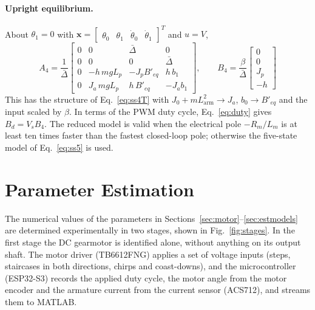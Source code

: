\documentclass[a4paper,11pt]{article}
\newcommand{\La}{L_{\mathrm{arm}}}
\begin{document}
\paragraph{Upright equilibrium.} About $\theta_1 = 0$ with $\mathbf{x} = \begin{bmatrix} \theta_0 & \theta_1 & \dot\theta_0 & \dot\theta_1 \end{bmatrix}^T$ and $u = V$,
\begin{equation}
\boxed{
  A_4 = \frac{1}{\bar\Delta}\begin{bmatrix}
  0 & 0 & \bar\Delta & 0\\
  0 & 0 & 0 & \bar\Delta\\
  0 & -h\, m g L_p & -J_p B'_{eq} & h\, b_1\\
  0 & J_a\, m g L_p & h\, B'_{eq} & -J_a b_1
  \end{bmatrix},
  \qquad
  B_4 = \frac{\beta}{\bar\Delta}\begin{bmatrix} 0 \\ 0 \\ J_p \\ -h \end{bmatrix}
}
\label{eq:ss_up}
\end{equation}
This has the structure of Eq.~\eqref{eq:ss4T} with $J_0 + m\La^2 \to J_a$, $b_0 \to B'_{eq}$ and the input scaled by $\beta$. In terms of the PWM duty cycle, Eq.~\eqref{eq:duty} gives $B_d = V_s B_4$. The reduced model is valid when the electrical pole $-R_m/L_m$ is at least ten times faster than the fastest closed-loop pole; otherwise the five-state model of Eq.~\eqref{eq:ss5} is used.

\section{Parameter Estimation}
\label{sec:estimation}
The numerical values of the parameters in Sections~\ref{sec:motor}--\ref{sec:estmodels} are determined experimentally in two stages, shown in Fig.~\ref{fig:stages}. In the first stage the DC gearmotor is identified alone, without anything on its output shaft. The motor driver (TB6612FNG) applies a set of voltage inputs (steps, staircases in both directions, chirps and coast-downs), and the microcontroller (ESP32-S3) records the applied duty cycle, the motor angle from the motor encoder and the armature current from the current sensor (ACS712), and streams them to MATLAB.
\end{document}
